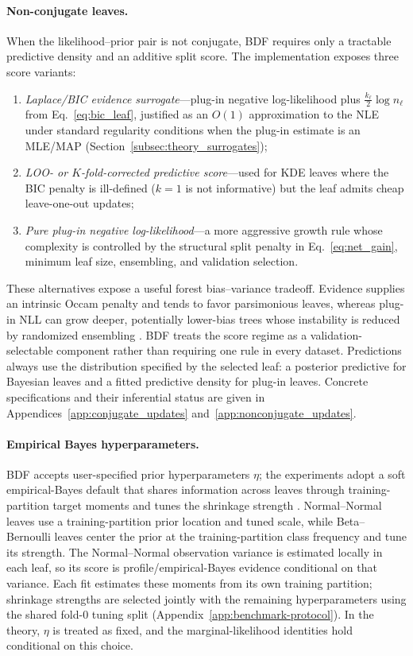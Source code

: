 \documentclass[10pt]{article} %
\begin{document}
\paragraph{Non-conjugate leaves.}
When the likelihood--prior pair is not conjugate, BDF requires only a tractable predictive density and an additive split score. The implementation exposes three score variants:
\begin{enumerate}
\item \emph{Laplace/BIC evidence surrogate}---plug-in negative log-likelihood plus $\tfrac{k_\ell}{2}\log n_\ell$ from Eq.~\eqref{eq:bic_leaf}, justified as an $O(1)$ approximation to the NLE under standard regularity conditions when the plug-in estimate is an MLE/MAP (Section~\ref{subsec:theory_surrogates});
\item \emph{LOO- or $K$-fold-corrected predictive score}---used for KDE leaves where the BIC penalty is ill-defined ($k=1$ is not informative) but the leaf admits cheap leave-one-out updates;
\item \emph{Pure plug-in negative log-likelihood}---a more aggressive growth rule whose complexity is controlled by the structural split penalty in Eq.~\eqref{eq:net_gain}, minimum leaf size, ensembling, and validation selection.
\end{enumerate}
These alternatives expose a useful forest bias--variance tradeoff. Evidence supplies an intrinsic Occam penalty and tends to favor parsimonious leaves, whereas plug-in NLL can grow deeper, potentially lower-bias trees whose instability is reduced by randomized ensembling \citep{breiman2001random}. BDF treats the score regime as a validation-selectable component rather than requiring one rule in every dataset. Predictions always use the distribution specified by the selected leaf: a posterior predictive for Bayesian leaves and a fitted predictive density for plug-in leaves. Concrete specifications and their inferential status are given in Appendices~\ref{app:conjugate_updates} and~\ref{app:nonconjugate_updates}.

\paragraph{Empirical Bayes hyperparameters.}\label{par:empirical_bayes}
BDF accepts user-specified prior hyperparameters $\eta$; the experiments adopt a soft empirical-Bayes default that shares information across leaves through training-partition target moments and tunes the shrinkage strength \citep{petrone2014empirical}. Normal--Normal leaves use a training-partition prior location and tuned scale, while Beta--Bernoulli leaves center the prior at the training-partition class frequency and tune its strength. The Normal--Normal observation variance is estimated locally in each leaf, so its score is profile/empirical-Bayes evidence conditional on that variance. Each fit estimates these moments from its own training partition; shrinkage strengths are selected jointly with the remaining hyperparameters using the shared fold-0 tuning split (Appendix~\ref{app:benchmark-protocol}). In the theory, $\eta$ is treated as fixed, and the marginal-likelihood identities hold conditional on this choice.
\end{document}
